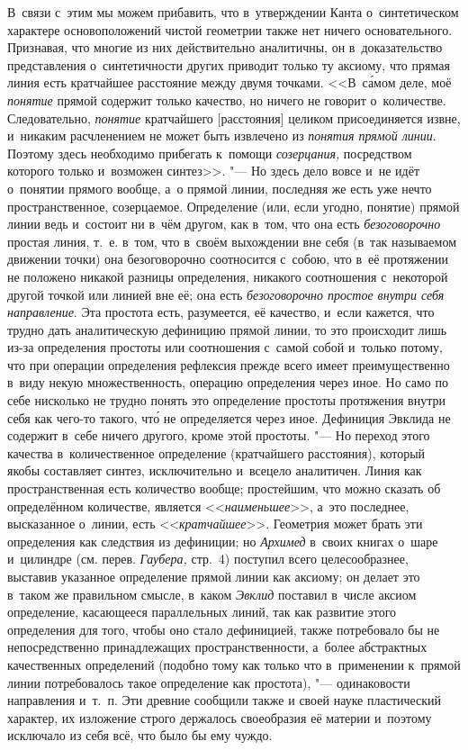 В~связи с~этим мы можем прибавить, что в~утверждении Канта о~синтетическом
характере основоположений чистой геометрии также нет ничего основательного.
Признавая, что многие из них действительно аналитичны, он в~доказательство
представления о~синтетичности других приводит только ту аксиому, что прямая
линия есть кратчайшее расстояние между двумя точками. <<В~с\'{а}мом деле, моё
{\em понятие} прямой содержит только качество, но ничего не говорит
о~количестве. Следовательно, {\em понятие} кратчайшего [расстояния]
целиком присоединяется извне, и~никаким расчленением не может быть извлечено
из {\em понятия прямой линии}. Поэтому здесь необходимо прибегать
к~помощи {\em созерцания,} посредством которого только и~возможен
синтез>>. "--- Но здесь дело вовсе и~не идёт о~понятии прямого вообще, а~о
прямой линии, последняя же есть уже нечто пространственное, созерцаемое.
Определение (или, если угодно, понятие) прямой линии ведь и~состоит ни в~чём
другом, как в~том, что она есть {\em безоговорочно} простая линия, т.~е. в~том,
что в~своём выхождении вне себя (в~так называемом движении точки) она
безоговорочно соотносится с~собою, что в~её протяжении не положено никакой
разницы определения, никакого соотношения с~некоторой другой точкой или линией
вне её; она есть {\em безоговорочно простое внутри себя направление}. Эта
простота есть, разумеется, её качество, и~если кажется, что трудно дать
аналитическую дефиницию прямой линии, то это происходит лишь из-за определения
простоты или соотношения с~самой собой и~только потому, что при операции
определения рефлексия прежде всего имеет преимущественно в~виду некую
множественность, операцию определения через иное. Но само по себе нисколько
не трудно понять это определение простоты протяжения внутри себя как чего-то
такого, чт\'{о} не определяется через иное. Дефиниция Эвклида не содержит в~себе ничего
другого, кроме этой простоты. "--- Но переход этого качества в~количественное
определение (кратчайшего расстояния), который якобы составляет синтез,
исключительно и~всецело аналитичен. Линия как пространственная есть количество
вообще; простейшим, что можно сказать об определённом количестве, является
<<{\em наименьшее}>>, а~это последнее, высказанное о~линии, есть
<<{\em кратчайшее}>>. Геометрия может брать эти определения как следствия из
дефиниции; но {\em Архимед} в~своих книгах о~шаре и~цилиндре (см. перев.
{\em Гаубера,} стр.~4) поступил всего целесообразнее, выставив указанное
определение прямой линии как аксиому; он делает это в~таком же правильном
смысле, в~каком {\em Эвклид} поставил в~числе аксиом определение, касающееся
параллельных линий, так как развитие этого определения для того, чтобы оно
стало дефиницией, также потребовало бы не непосредственно принадлежащих
пространственности, а~более абстрактных качественных определений (подобно тому
как только что в~применении к~прямой линии потребовалось такое определение как
простота), "--- одинаковости направления и~т.~п. Эти древние сообщили также и
своей науке пластический характер, их изложение строго держалось своеобразия её
материи и~поэтому исключало из себя всё, что было бы ему чуждо.


